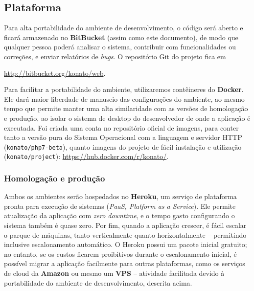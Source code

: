 \documentclass[12pt,a4paper,twoside,hyphens,english,brazil]{abntex2}
\begin{document}
\subsection{Plataforma}
Para alta portabilidade do ambiente de desenvolvimento, o código será aberto e ficará armazenado no \textbf{BitBucket} (assim como este documento), de modo que qualquer pessoa poderá analisar o sistema, contribuir com funcionalidades ou correções, e enviar relatórios de \textit{bugs}. O repositório Git do projeto fica em {\url{http://bitbucket.org/konato/web}.

Para facilitar a portabilidade do ambiente, utilizaremos contêineres do \textbf{Docker}\footnotemark. Ele dará maior liberdade de manuseio das configurações do ambiente, ao mesmo tempo que permite manter uma alta similaridade com as versões de homologação e produção, ao isolar o sistema de desktop do desenvolvedor de onde a aplicação é executada.\cite{docker-presentation} Foi criada uma conta no repositório oficial de imagens, para conter tanto a versão pura do Sistema Operacional com a linguagem e servidor HTTP (\texttt{konato/php7-beta}), quanto imagens do projeto de fácil instalação e utilização (\texttt{konato/project}): \url{https://hub.docker.com/r/konato/}.

\subsubsection*{Homologação e produção}
Ambos os ambientes serão hospedados no \textbf{Heroku}, um serviço de plataforma pronta para execução de sistemas (\textit{PaaS, Platform as a Service}). Ele permite atualização da aplicação com \textit{zero downtime}, e o tempo gasto configurando o sistema também é quase zero. Por fim, quando a aplicação crescer, é fácil escalar o parque de máquinas, tanto verticalmente quanto horizontalmente -- permitindo inclusive escalonamento automático. %
O Heroku possui um pacote inicial gratuito; no entanto, se os custos ficarem proibitivos durante o escalonamento inicial, é possível migrar a aplicação facilmente para outras plataformas, como os serviços de cloud da \textbf{Amazon} ou mesmo um \textbf{VPS} -- atividade facilitada devido à portabilidade do ambiente de desenvolvimento, descrita acima.

}
\end{document}
